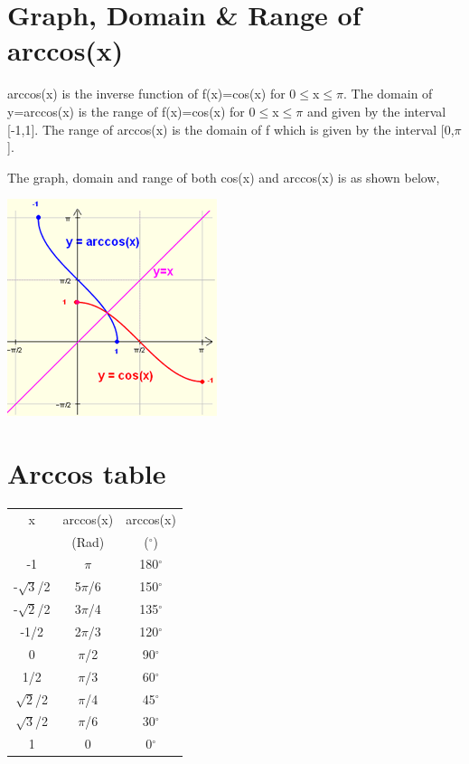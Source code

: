 \documentclass[12pt]{article}
\begin{document}
	\section{Graph, Domain \& Range of arccos(x)}
		arccos(x) is the inverse function of f(x)=cos(x) for 0$\leq$x$\leq$$\pi$. The domain of y=arccos(x) is the range of f(x)=cos(x) for 0$\leq$x$\leq$$\pi$ and given by the interval [-1,1]. The range of arccos(x) is the domain of f which is given by the interval [0,$\pi$].\par
		The graph, domain and range of both cos(x) and arccos(x) is as shown below,
		\begin{center}
			\includegraphics[width=0.35\columnwidth]{pic2.png}
		\end{center}
	
	\section{Arccos table}
	\begin{center}
		\begin{tabular}{c|c|c}
			\hline
			x&arccos(x)&arccos(x)\\
			 &(Rad)&($^{\circ}$)\\
			 \hline
			 -1&$\pi$&180$^{\circ}$\\
			 \hline
			 -$\sqrt{3}$/2&5$\pi$/6&150$^{\circ}$\\
			 \hline
			 -$\sqrt{2}$/2&3$\pi$/4&135$^{\circ}$\\
			 \hline
			 -1/2&2$\pi$/3&120$^{\circ}$\\
			 \hline
			 0&$\pi$/2&90$^{\circ}$\\
			 \hline
			1/2&$\pi$/3&60$^{\circ}$\\
			 \hline
			 $\sqrt{2}$/2&$\pi$/4&45$^{\circ}$\\
			 \hline
			 $\sqrt{3}$/2&$\pi$/6&30$^{\circ}$\\
			 \hline
			 1&0&0$^{\circ}$\\
			 \hline
		\end{tabular}
	\end{center}
	
\end{document}
